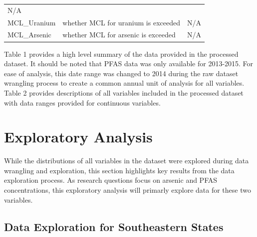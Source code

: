 \documentclass[12pt,]{article}
\begin{document}
\begin{longtable}[]{@{}lll@{}}
\begin{minipage}[t]{0.23\columnwidth}
N/A\strut
\end{minipage}\tabularnewline
\begin{minipage}[t]{0.22\columnwidth}\raggedright
MCL\_Uranium\strut
\end{minipage} & \begin{minipage}[t]{0.46\columnwidth}\raggedright
whether MCL for uranium is exceeded\strut
\end{minipage} & \begin{minipage}[t]{0.23\columnwidth}\raggedright
N/A\strut
\end{minipage}\tabularnewline
\begin{minipage}[t]{0.22\columnwidth}\raggedright
MCL\_Arsenic\strut
\end{minipage} & \begin{minipage}[t]{0.46\columnwidth}\raggedright
whether MCL for arsenic is exceeded\strut
\end{minipage} & \begin{minipage}[t]{0.23\columnwidth}\raggedright
N/A\strut
\end{minipage}\tabularnewline
\bottomrule
\end{longtable}

Table 1 provides a high level summary of the data provided in the
processed dataset. It should be noted that PFAS data was only available
for 2013-2015. For ease of analysis, this date range was changed to 2014
during the raw dataset wrangling process to create a common annual unit
of analysis for all variables. Table 2 provides descriptions of all
variables included in the processed dataset with data ranges provided
for continuous variables.

\newpage

\hypertarget{exploratory-analysis}{%
\section{Exploratory Analysis}\label{exploratory-analysis}}

While the distributions of all variables in the dataset were explored
during data wrangling and exploration, this section highlights key
results from the data exploration process. As research questions focus
on arsenic and PFAS concentrations, this exploratory analysis will
primarly explore data for these two variables.

\hypertarget{data-exploration-for-southeastern-states}{%
\subsection{Data Exploration for Southeastern
States}\label{data-exploration-for-southeastern-states}}
\end{document}
